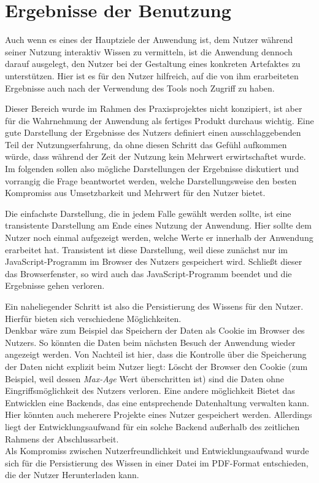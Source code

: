 \section{Ergebnisse der Benutzung}
Auch wenn es eines der Hauptziele der Anwendung ist, dem Nutzer während seiner Nutzung interaktiv Wissen zu vermitteln, ist die Anwendung dennoch darauf ausgelegt, den Nutzer bei der Gestaltung eines konkreten Artefaktes zu unterstützen. Hier ist es für den Nutzer hilfreich, auf die von ihm erarbeiteten Ergebnisse auch nach der Verwendung des Tools noch Zugriff zu haben.

Dieser Bereich wurde im Rahmen des Praxisprojektes nicht konzipiert, ist aber für die Wahrnehmung der Anwendung als fertiges Produkt durchaus wichtig. Eine gute Darstellung der Ergebnisse des Nutzers definiert einen ausschlaggebenden Teil der Nutzungserfahrung, da ohne diesen Schritt das Gefühl aufkommen würde, dass während der Zeit der Nutzung kein Mehrwert erwirtschaftet wurde.
Im folgenden sollen also mögliche Darstellungen der Ergebnisse diskutiert und vorrangig die Frage beantwortet werden, welche Darstellungsweise den besten Kompromiss aus Umsetzbarkeit und Mehrwert für den Nutzer bietet.

Die einfachste Darstellung, die in jedem Falle gewählt werden sollte, ist eine transistente Darstellung am Ende eines Nutzung der Anwendung. Hier sollte dem Nutzer noch einmal aufgezeigt werden, welche Werte er innerhalb der Anwendung erarbeitet hat. Transistent ist diese Darstellung, weil diese zunächst nur im JavaScript-Programm im Browser des Nutzers gespeichert wird. Schließt dieser das Browserfenster, so wird auch das JavaScript-Programm beendet und die Ergebnisse gehen verloren.

Ein naheliegender Schritt ist also die Persistierung des Wissens für den Nutzer. Hierfür bieten sich verschiedene Möglichkeiten. \\
Denkbar wäre zum Beispiel das Speichern der Daten als Cookie im Browser des Nutzers. So könnten die Daten beim nächsten Besuch der Anwendung wieder angezeigt werden. Von Nachteil ist hier, dass die Kontrolle über die Speicherung der Daten nicht explizit beim Nutzer liegt: Löscht der Browser den Cookie (zum Beispiel, weil dessen \textit{Max-Age}\footnotemark{} Wert überschritten ist) sind die Daten ohne Eingriffsmöglichkeit des Nutzers verloren.
Eine andere möglichkeit Bietet das Entwicklen eine Backends, das eine entsprechende Datenhaltung verwalten kann. Hier könnten auch meherere Projekte eines Nutzer gespeichert werden. Allerdings liegt der Entwicklungsaufwand für ein solche Backend außerhalb des zeitlichen Rahmens der Abschlussarbeit. \\
Als Kompromiss zwischen Nutzerfreundlichkeit und Entwicklungsaufwand wurde sich für die Persistierung des Wissen in einer Datei im PDF-Format entschieden, die der Nutzer Herunterladen kann.

